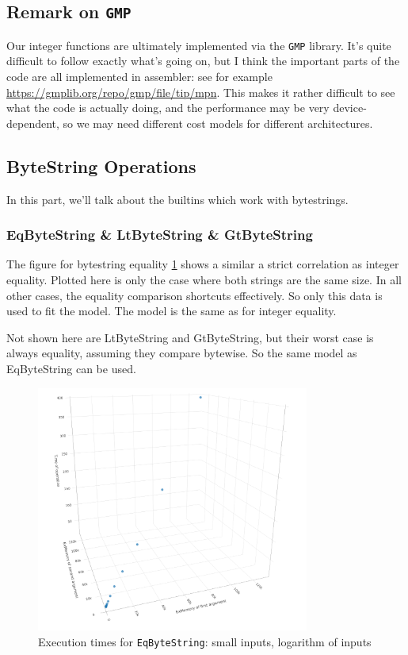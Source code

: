 \documentclass[a4paper]{article}
\begin{document}
\subsection*{Remark on \texttt{GMP}}
Our integer functions are ultimately implemented via the \texttt{GMP} library.
It's quite difficult to follow exactly what's going on, but I think
the important parts of the code are all implemented in assembler: see
for example \url{https://gmplib.org/repo/gmp/file/tip/mpn}.  This
makes it rather difficult to see what the code is actually doing, and
the performance may be very device-dependent, so we may need different
cost models for different architectures.

\subsection*{ByteString Operations}

In this part, we'll talk about the builtins which work with bytestrings.

\subsubsection*{EqByteString \& LtByteString \& GtByteString}

The figure for bytestring equality \ref{fig:EqByteString} shows a similar a
strict correlation as integer equality. Plotted here is only the case where both
strings are the same size. In all other cases, the equality comparison shortcuts
effectively. So only this data is used to fit the model. The model is the same
as for integer equality.  

Not shown here are LtByteString and GtByteString, but their worst case is always
equality, assuming they compare bytewise. So the same model as EqByteString can
be used.

\begin{figure}
\centering
  \includegraphics[width=0.8\textwidth]{figures/EqByteString.png}
  \caption{Execution times for \texttt{EqByteString}: small inputs, logarithm of inputs}
  \label{fig:EqByteString}
\end{figure}
\end{document}

